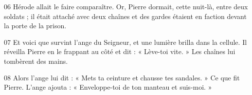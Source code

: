 
06 Hérode allait le faire comparaître. Or, Pierre dormait, cette nuit-là, entre deux soldats ; il était attaché avec deux chaînes et des gardes étaient en faction devant la porte de la prison.

07 Et voici que survint l’ange du Seigneur, et une lumière brilla dans la cellule. Il réveilla Pierre en le frappant au côté et dit : « Lève-toi vite. » Les chaînes lui tombèrent des mains.

08 Alors l’ange lui dit : « Mets ta ceinture et chausse tes sandales. » Ce que fit Pierre. L’ange ajouta : « Enveloppe-toi de ton manteau et suis-moi. »
